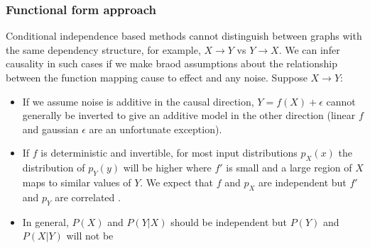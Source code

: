 \documentclass{article}
\begin{document}
\subsubsection*{Functional form approach}
Conditional independence based methods cannot distinguish between graphs with the same dependency structure, for example,  $X \rightarrow Y$ vs $Y \rightarrow X$. We can infer causality in such cases if we make braod assumptions about the relationship between the function mapping cause to effect and any noise. Suppose $X \rightarrow Y$:
\begin{itemize}
\item If we assume noise is additive in the causal direction, $Y = f(X)+\epsilon$ cannot generally be inverted to give an additive model in the other direction (linear $f$ and gaussian $\epsilon$ are an unfortunate exception)\cite{Hoyer2009}.
\item If $f$ is deterministic and invertible, for most input distributions $p_X(x)$ the distribution of $p_Y(y)$ will be higher where $f'$ is small and a large region of $X$ maps to similar values of $Y$. We expect that $f$ and $p_X$ are independent but $f'$ and $p_Y$ are correlated \cite{Daniusis2010}.
\item In general, $P(X)$ and $P(Y|X)$ should be independent but $P(Y)$ and $P(X|Y)$ will not be \cite{Scholkopf2012}
\end{itemize}

\end{document}
